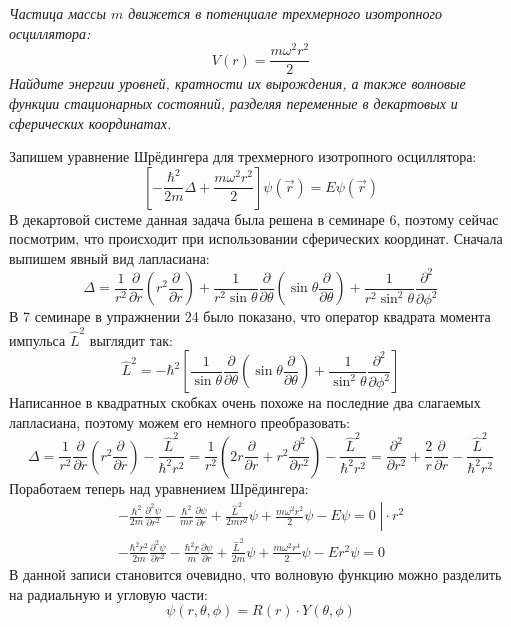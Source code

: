 \begin{center}
    \textit{Частица массы $m$ движется в потенциале трехмерного изотропного осциллятора:}
    \[
    V(r) = \frac{m\omega^2r^2}{2}
    \]
    \textit{Найдите энергии уровней, кратности их вырождения, а также волновые функции стационарных состояний, разделяя переменные в декартовых и сферических координатах.}
\end{center}
Запишем уравнение Шрёдингера для трехмерного изотропного осциллятора:
\[
\left[-\frac{\hbar^2}{2m}\Delta + \frac{m\omega^2 r^2}{2}\right]\psi(\Vec{r}) = E\psi(\Vec{r})
\]
В декартовой системе данная задача была решена в семинаре 6, поэтому сейчас посмотрим, что происходит при использовании сферических координат. Сначала выпишем явный вид лапласиана:
\[
\Delta = \frac{1}{r^2}\frac{\partial}{\partial r}\left(r^2\frac{\partial}{\partial r}\right) + \frac{1}{r^2 \sin\theta}\frac{\partial}{\partial\theta}\left(\sin\theta\frac{\partial}{\partial\theta}\right) + \frac{1}{r^2\sin^2\theta}\frac{\partial^2}{\partial\phi^2}
\]
В 7 семинаре в упражнении 24 было показано, что оператор квадрата момента импульса $\hat{L}^2$ выглядит так:
\[
\hat{L}^2 = -\hbar^2\left[\frac{1}{\sin\theta}\frac{\partial}{\partial \theta}\left( \sin\theta\frac{\partial}{\partial \theta} \right) + \frac{1}{\sin^2\theta}\frac{\partial^2}{\partial\phi^2}\right]
\]
Написанное в квадратных скобках очень похоже на последние два слагаемых лапласиана, поэтому можем его немного преобразовать:
\[
\Delta = \frac{1}{r^2}\frac{\partial}{\partial r}\left(r^2\frac{\partial}{\partial r}\right) - \frac{\hat{L}^2}{\hbar^2 r^2} = \frac{1}{r^2}\left(2r\frac{\partial}{\partial r} + r^2 \frac{\partial^2}{\partial r^2}\right) - \frac{\hat{L}^2}{\hbar^2 r^2} = \frac{\partial^2}{\partial r^2} + \frac{2}{r}\frac{\partial}{\partial r} - \frac{\hat{L}^2}{\hbar^2 r^2}
\]
Поработаем теперь над уравнением Шрёдингера:
\begin{gather*}
    \left. -\frac{\hbar^2}{2m}\frac{\partial^2\psi}{\partial r^2} - \frac{\hbar^2}{mr}\frac{\partial\psi}{\partial r} + \frac{\hat{L}^2}{2mr^2}\psi + \frac{m\omega^2 r^2}{2}\psi - E\psi = 0 \; \right| \cdot r^2\\
    -\frac{\hbar^2 r^2}{2m}\frac{\partial^2\psi}{\partial r^2} - \frac{\hbar^2 r}{m}\frac{\partial\psi}{\partial r} + \frac{\hat{L}^2}{2m}\psi + \frac{m\omega^2 r^4}{2}\psi - Er^2\psi = 0
\end{gather*}
В данной записи становится очевидно, что волновую функцию можно разделить на радиальную и угловую части:
\[
\psi(r, \theta, \phi) = R(r) \cdot Y(\theta, \phi)
\]
